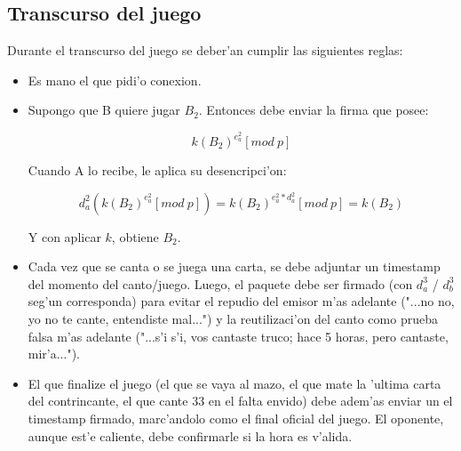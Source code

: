 \subsection{Transcurso del juego}
Durante el transcurso del juego se deber'an cumplir las siguientes reglas:

\begin{itemize}
\item Es mano el que pidi'o conexion.

\item Supongo que B quiere jugar $B_2$. Entonces debe enviar la firma que posee:

$$	k(B_2)^{e^2_a} [mod\ p] $$
	
Cuando A lo recibe, le aplica su desencripci'on:

$$	d^2_a(k(B_2)^{e^2_a} [mod\ p]) = 
	k(B_2)^{e^2_a * d^2_a} [mod\ p] = 
	k(B_2) $$

Y con aplicar $k$, obtiene $B_2$.

\item Cada vez que se canta o se juega una carta, se debe adjuntar un timestamp del momento del canto/juego. Luego, el paquete debe ser firmado (con $d^3_a$ / $d^3_b$ seg'un corresponda) para evitar el repudio del emisor m'as adelante ("...no no, yo no te cante, entendiste mal...") y la reutilizaci'on del canto como prueba falsa m'as adelante ("...s'i s'i, vos cantaste truco; hace 5 horas, pero cantaste, mir'a...").

\item El que finalize el juego (el que se vaya al mazo, el que mate la 'ultima carta del contrincante, el que cante 33 en el falta envido) debe adem'as enviar un el timestamp firmado, marc'andolo como el final oficial del juego. El oponente, aunque est'e caliente, debe confirmarle si la hora es v'alida.

\end{itemize}
